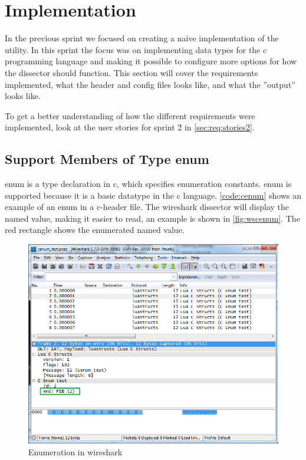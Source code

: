 \section{Implementation}
\label{sec:sp2:impl}
In the previous sprint we focused on creating a naive implementation of the 
\gls{utility}. In this sprint the focus was on implementing data types for the 
\Gls{c} programming language and making it possible to configure more options for how 
the \gls{dissector} should function. This section will cover the requirements 
implemented, what the \gls{header} and config files looks like, and what the ''output'' looks like.

To get a better understanding of how the different requirements were implemented,
look at the user stories for sprint 2 in \autoref{sec:req:stories2}.

\subsection{Support Members of Type \gls{enum}}

\label{sec:supportenum}
\Gls{enum} is a type declaration in \Gls{c}, which specifies enumeration constants.  \Gls{enum} 
is supported because it is a basic datatype in the \Gls{c} language. 
\autoref{code:cenum} shows an example of an \gls{enum} in a \Gls{c}-\gls{header} file. The 
\Gls{wireshark} \gls{dissector} will display the named value, making it 
easier to read, an example is shown in \autoref{fig:wscenum}. The red 
rectangle shows the \gls{enumerated named value}.

\begin{figure}[ht]
	\center
	\includegraphics[width=\textwidth]{./sprints/img/wireshark_cenum}
	\caption{Enumeration in \Gls{wireshark}\label{fig:wscenum}}
\end{figure}

